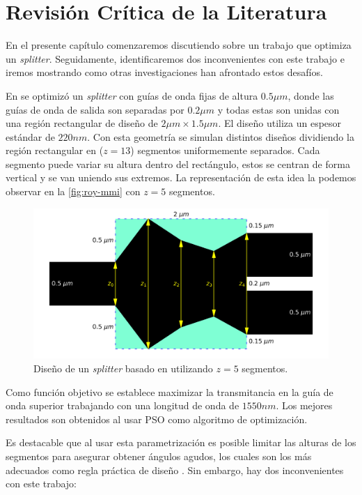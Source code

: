 \chapter{Revisión Crítica de la Literatura}

En el presente capítulo comenzaremos discutiendo sobre un trabajo que optimiza un \emph{splitter}.
Seguidamente, identificaremos dos inconvenientes con este trabajo e iremos mostrando como otras 
investigaciones han afrontado estos desafíos.

En \cite{Prosopio-Galarza2019} se optimizó un \emph{splitter} con guías de onda fijas de altura $0.5 \mu m$, 
donde las guías de onda de salida son separadas por $0.2 \mu m$ y 
todas estas son unidas con una región rectangular de diseño de $2 \mu m \times 1.5 \mu m$.
El diseño utiliza un espesor estándar de $220 nm$.
Con esta geometría se simulan distintos diseños dividiendo la región rectangular en ($z = 13$) segmentos
uniformemente separados.
Cada segmento puede variar su altura dentro del rectángulo, estos se centran de forma vertical y
se van uniendo sus extremos. 
La representación de esta idea la podemos observar en la \autoref{fig:roy-mmi} con $z = 5$ segmentos.

\begin{figure}[ht]
  \centering
  \includegraphics[scale=0.5]{image/related-works/mmi-angles.png}
  \caption{Diseño de un \emph{splitter} basado en \citep{Prosopio-Galarza2019} utilizando $z = 5$ segmentos.} 
  \label{fig:roy-mmi}
\end{figure}

Como función objetivo se establece maximizar la transmitancia en la guía de onda superior trabajando con una
longitud de onda de $1550 nm$.
Los mejores resultados son obtenidos al usar PSO como algoritmo de optimización.

Es destacable que al usar esta parametrización es posible limitar las alturas de los segmentos para asegurar 
obtener ángulos agudos, los cuales son los más adecuados como regla práctica de diseño
\citep{LukasChrostowski2010}.
Sin embargo, hay dos inconvenientes con este trabajo:

